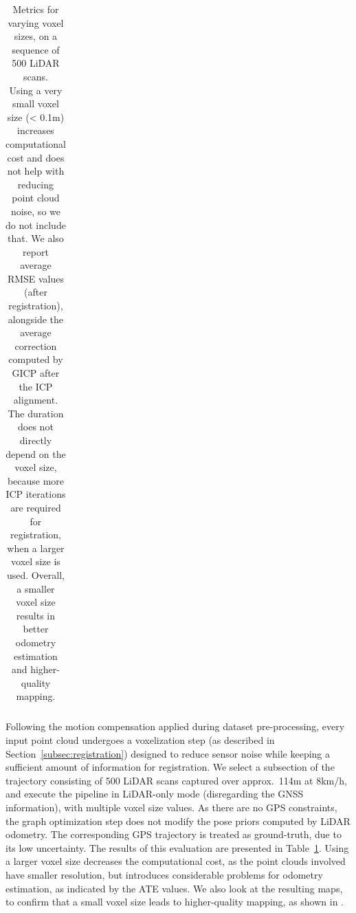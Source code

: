 \begin{table}[h]
{\begin{tabular}{c|c|cc|cc|c|cc}
            \hline
        \end{tabular}
    }
    \caption{Metrics for varying voxel sizes, on a sequence of 500 LiDAR scans. \\Using a very small voxel size (< 0.1m) increases computational cost and does not help with reducing point cloud noise, so we do not include that. We also report average RMSE values (after registration), alongside the average correction computed by GICP after the ICP alignment. The duration does not directly depend on the voxel size, because more ICP iterations are required for registration, when a larger voxel size is used. Overall, a smaller voxel size results in better odometry estimation and higher-quality mapping.}
    \label{tab:voxel_metrics}
\end{table}


Following the motion compensation applied during dataset pre-processing, every input point cloud undergoes a voxelization step (as described in Section~\ref{subsec:registration}) designed to reduce sensor noise while keeping a sufficient amount of information for registration. We select a subsection of the trajectory consisting of 500 LiDAR scans captured over approx.~114m at 8km/h, and execute the pipeline in LiDAR-only mode (disregarding the GNSS information), with multiple voxel size values. As there are no GPS constraints, the graph optimization step does not modify the pose priors computed by LiDAR odometry. The corresponding GPS trajectory is treated as ground-truth, due to its low uncertainty. The results of this evaluation are presented in Table~\ref{tab:voxel_metrics}. Using a larger voxel size decreases the computational cost, as the point clouds involved have smaller resolution, but introduces considerable problems for odometry estimation, as indicated by the ATE values. We also look at the resulting maps, to confirm that a small voxel size leads to higher-quality mapping, as shown in .

